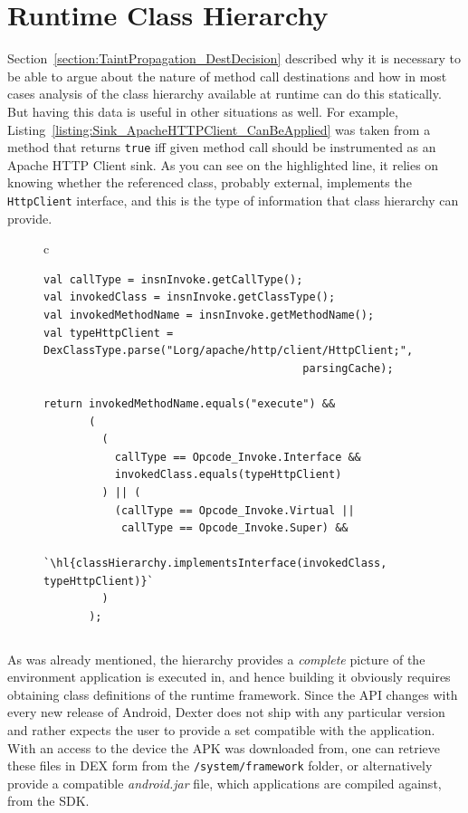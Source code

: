 \documentclass[12pt,twoside,notitlepage]{report}
\begin{document}
\section{Runtime Class Hierarchy}

Section~\ref{section:TaintPropagation_DestDecision} described why it is necessary to be able to argue about the nature of method call destinations and how in most cases analysis of the class hierarchy available at runtime can do this statically. But having this data is useful in other situations as well. For example, Listing~\ref{listing:Sink_ApacheHTTPClient_CanBeApplied} was taken from a method that returns \verb$true$ iff given method call should be instrumented as an Apache HTTP Client sink. As you can see on the highlighted line, it relies on knowing whether the referenced class, probably external, implements the \verb$HttpClient$ interface, and this is the type of information that class hierarchy can provide.

\begin{figure}[h]
	\centering
	\begin{tabular}{c}
	\begin{lstlisting}
val callType = insnInvoke.getCallType();
val invokedClass = insnInvoke.getClassType();
val invokedMethodName = insnInvoke.getMethodName();
val typeHttpClient = DexClassType.parse("Lorg/apache/http/client/HttpClient;", 
                                        parsingCache);

return invokedMethodName.equals("execute") &&
       (
         (
           callType == Opcode_Invoke.Interface && 
           invokedClass.equals(typeHttpClient)
         ) || (
           (callType == Opcode_Invoke.Virtual || 
           	callType == Opcode_Invoke.Super) && 
           `\hl{classHierarchy.implementsInterface(invokedClass, typeHttpClient)}`
         )
       );
	\end{lstlisting}
	\end{tabular}
	\begin{lstlisting}[caption={Code that decides whether a method call given by instruction in \texttt{insnInvoke} should be instrumented as an Apache HTTP Client sink.},
	                   label={listing:Sink_ApacheHTTPClient_CanBeApplied}]
	\end{lstlisting}
\end{figure}

As was already mentioned, the hierarchy provides a \emph{complete} picture of the environment application is executed in, and hence building it obviously requires obtaining class definitions of the runtime framework. Since the API changes with every new release of Android, Dexter does not ship with any particular version and rather expects the user to provide a set compatible with the application. With an access to the device the APK was downloaded from, one can retrieve these files in DEX form from the \verb$/system/framework$ folder, or alternatively provide a compatible \emph{android.jar} file, which applications are compiled against, from the SDK. 
\end{document}

